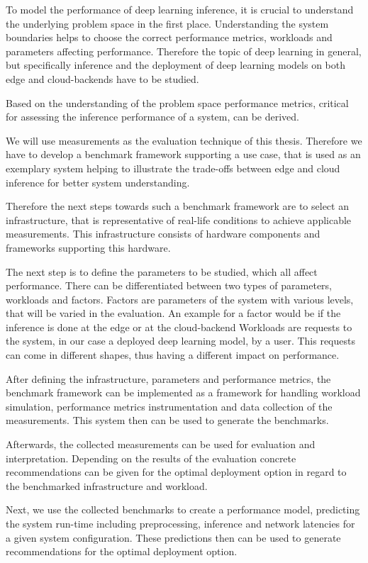 To model the performance of deep learning inference, it is crucial to understand the underlying problem space in the first place.
Understanding the system boundaries helps to choose the correct performance metrics, workloads and parameters affecting performance.
Therefore the topic of deep learning in general, but specifically inference and the deployment of deep learning models on both edge and cloud-backends have to be studied.

Based on the understanding of the problem space performance metrics, critical for assessing the inference performance of a system, can be derived.

We will use measurements as the evaluation technique of this thesis. 
Therefore we have to develop a benchmark framework supporting a use case, that is used as an exemplary system helping to illustrate the trade-offs between edge and cloud inference for better system understanding.

Therefore the next steps towards such a benchmark framework are to select an infrastructure, that is representative of real-life conditions to achieve applicable measurements. 
This infrastructure consists of hardware components and frameworks supporting this hardware. 

The next step is to define the parameters to be studied, which all affect performance.
There can be differentiated between two types of parameters, workloads and factors.
Factors are parameters of the system with various levels, that will be varied in the evaluation. An example for a factor would be if the inference is done at the edge or at the cloud-backend
Workloads are requests to the system, in our case a deployed deep learning model, by a user.
This requests can come in different shapes, thus having a different impact on performance.



After defining the infrastructure, parameters and performance metrics, the benchmark framework can be implemented as a framework for handling workload simulation, performance metrics instrumentation and data collection of the measurements.
This system then can be used to generate the benchmarks. 

Afterwards, the collected measurements can be used for evaluation and interpretation.
Depending on the results of the evaluation concrete recommendations can be given for the optimal deployment option in regard to the benchmarked infrastructure and workload.

Next, we use the collected benchmarks to create a performance model, predicting the system run-time including preprocessing, inference and network latencies for a given system configuration.
These predictions then can be used to generate recommendations for the optimal deployment option.

